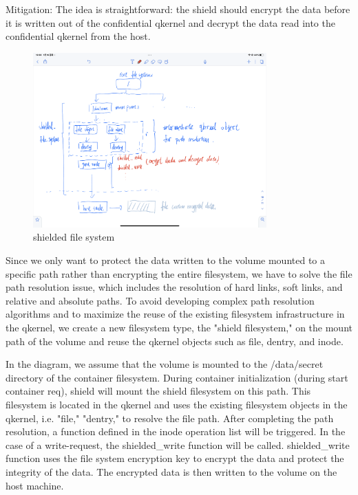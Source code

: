Mitigation: The idea is straightforward: the shield should encrypt the data before it is written out of the confidential qkernel and decrypt the data read into the confidential qkernel from the host. 

\begin{figure}[H]
    \centering
    \includegraphics[width=0.8\textwidth]{images/IMG_4413.PNG}
    \caption[shielded file system]{shielded file system}
    \label{fig:shielded_filesystem}
\end{figure}
Since we only want to protect the data written to the volume mounted to a specific path rather than encrypting the entire filesystem, we have to solve the file path resolution issue, which includes the 
resolution of hard links, soft links, and relative and absolute paths. To avoid developing complex path resolution algorithms and to maximize the reuse of the existing filesystem infrastructure in the qkernel, we create a new filesystem type, the "shield filesystem," on 
the mount path of the volume and reuse the qkernel objects such as file, dentry, and inode.

In the diagram, we assume that the volume is mounted to the /data/secret directory of the container filesystem. During container initialization (during start container req), shield will mount the shield filesystem on this path. This filesystem is located in the qkernel and 
uses the existing filesystem objects in the qkernel, i.e. "file," "dentry," to resolve the file path. After completing the path resolution, a function defined in the inode operation list will be triggered. In the case of a write-request, the shielded\_write function will be called.
shielded\_write function uses the file system encryption key to encrypt the data and protect the integrity of the data. The encrypted data is then written to the volume on the host machine.

